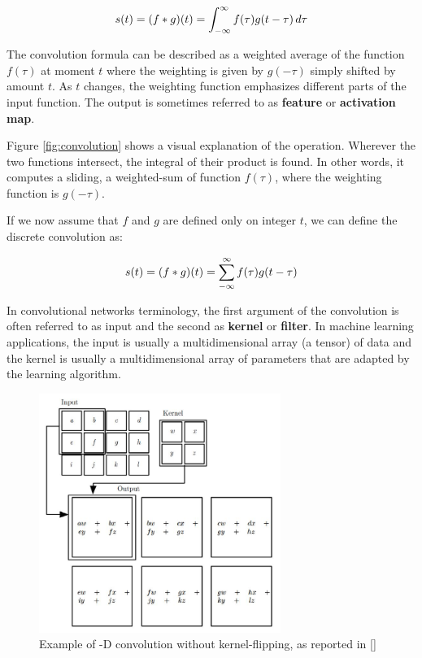 \begin{equation} \notag
	s(t) = (f * g)(t) = \int_{-\infty}^{\infty}f(\tau)g(t-\tau)\,d\tau
\end{equation}

The convolution formula can be described as a weighted average of the function $f(\tau)$ at moment $t$ where the weighting is given by $g(-\tau)$ simply shifted by amount $t$. As $t$ changes, the weighting function emphasizes different parts of the input function. The output is sometimes referred to as \textbf{feature} or  \textbf{activation map}.

Figure \ref{fig:convolution} shows a visual explanation of the operation. Wherever the two functions intersect, the integral of their product is found. In other words, it computes a sliding, \ie  a weighted-sum of function $f(\tau)$, where the weighting function is $g(-\tau)$.

If we now assume that $f$ and $g$ are defined only on integer $t$, we
can define the discrete convolution as:

\begin{equation} \notag
	s(t) = (f * g)(t) = \sum_{-\infty}^{\infty}f(\tau)g(t-\tau)
\end{equation}

In convolutional networks terminology, the first argument of the convolution is often referred to as input and the second as \textbf{kernel} or \textbf{filter}. In machine learning applications, the input is usually a multidimensional array (\ie a tensor) of data and the kernel is usually a multidimensional array of parameters that are adapted by the learning algorithm.

\begin{figure}[ht]
	\centering
	\includegraphics[width=0.7\textwidth]{Images/convolution_example}
	\caption{Example of -D convolution without kernel-flipping, as reported in [\cite{Goodfellow-et-al-2016}]}\label{fig:convolution_example}
\end{figure}

